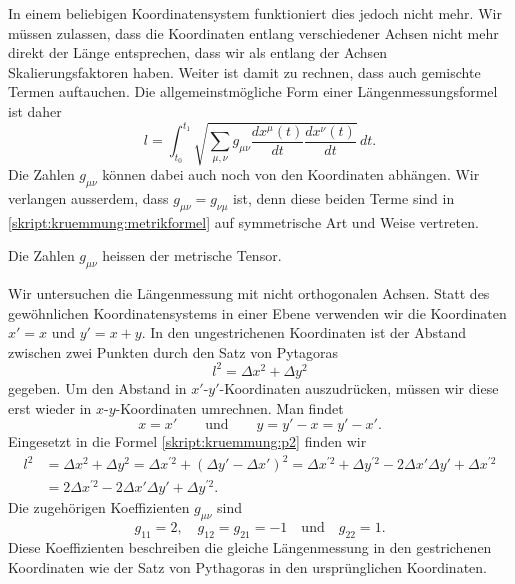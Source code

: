 In einem beliebigen Koordinatensystem funktioniert dies jedoch nicht
mehr.
Wir müssen zulassen, dass die Koordinaten entlang verschiedener
Achsen nicht mehr direkt der Länge entsprechen, dass wir als
entlang der Achsen Skalierungsfaktoren haben.
Weiter ist damit zu rechnen, dass auch gemischte Termen auftauchen.
Die allgemeinstmögliche Form einer Längenmessungsformel ist daher
\begin{equation}
l
=
\int_{t_0}^{t_1}
\sqrt{\sum_{\mu,\nu} g_{\mu\nu} \frac{dx^{\mu}(t)}{dt}\frac{dx^{\nu}(t)}{dt}}\,dt.
\label{skript:kruemmung:metrikformel}
\end{equation}
Die Zahlen $g_{\mu\nu}$ können dabei auch noch von den Koordinaten
abhängen.
Wir verlangen ausserdem, dass $g_{\mu\nu}=g_{\nu\mu}$ ist, denn
diese beiden Terme sind in \eqref{skript:kruemmung:metrikformel}
auf symmetrische Art und Weise vertreten.

\begin{definition}
Die Zahlen $g_{\mu\nu}$ heissen der metrische Tensor.
\end{definition}

%
%
\begin{beispiel}
Wir untersuchen die Längenmessung mit nicht orthogonalen Achsen.
Statt des gewöhnlichen Koordinatensystems in einer Ebene verwenden
wir die Koordinaten $x'=x$ und $y'=x+y$.
In den ungestrichenen Koordinaten ist der Abstand zwischen zwei
Punkten durch den Satz von Pytagoras
\begin{equation}
l^2 = \Delta x^2 + \Delta y^2
\label{skript:kruemmung:p2}
\end{equation}
gegeben.
Um den Abstand in $x'$-$y'$-Koordinaten auszudrücken, müssen wir diese
erst wieder in $x$-$y$-Koordinaten umrechnen. 
Man findet
\[
x=x'
\qquad\text{und}\qquad
y=y'-x=y'-x'.
\]
Eingesetzt in die Formel \eqref{skript:kruemmung:p2} finden wir
\begin{align*}
l^2
&=
\Delta x^2 + \Delta y^2
=
\Delta x^{\prime 2}
+
(\Delta y'- \Delta x')^2
=
\Delta x^{\prime 2}
+
\Delta y^{\prime 2}-2\Delta x'\Delta y' + \Delta x^{\prime 2}
\\
&= 2 \Delta x^{\prime 2} - 2 \Delta x'\Delta y'+\Delta y^{\prime 2}.
\end{align*}
Die zugehörigen Koeffizienten $g_{\mu\nu}$ sind
\[
g_{11} = 2,\quad
g_{12}=g_{21}=-1\quad\text{und}\quad
g_{22}=1.
\]
Diese Koeffizienten beschreiben die gleiche Längenmessung in den 
gestrichenen Koordinaten wie der Satz von Pythagoras in den ursprünglichen
Koordinaten.
\end{beispiel}


